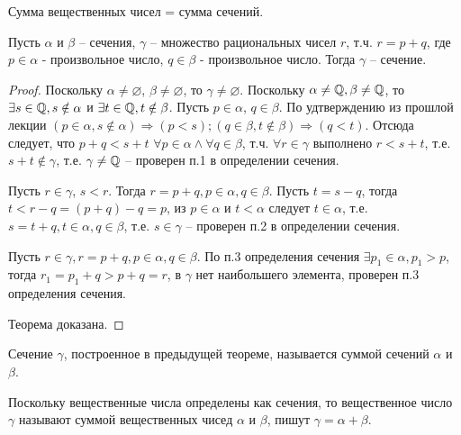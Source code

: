 \documentclass[main]{subfiles}
\begin{document}
\begin{definition}
    Сумма вещественных чисел = сумма сечений.
\end{definition}
\begin{theorem}
    Пусть $\alpha$ и $\beta$ -- сечения, $\gamma$ -- множество рациональных чисел
    $r$, т.ч. $r = p + q$, где $p \in \alpha$ - произвольное число, 
    $q \in \beta$ - произвольное число. Тогда $\gamma$ -- сечение.
\end{theorem}
\begin{proof}
    Поскольку $\alpha \neq \varnothing$, $\beta \neq \varnothing$, то 
    $\gamma \neq \varnothing$. Поскольку $\alpha \neq \mathbb{Q}, \beta \neq \mathbb{Q}$, то
    $\exists s \in \mathbb{Q}, s \notin \alpha$ и $\exists t \in \mathbb{Q}, t \notin \beta$.
    Пусть $p \in \alpha$, $q \in \beta$. 
    По удтверждению из прошлой лекции $(p \in \alpha, s \notin \alpha) \Rightarrow
    (p < s); (q \in \beta, t \notin \beta) \Rightarrow (q < t)$. 
    Отсюда следует, что $p + q < s + t$ $\forall p \in \alpha \wedge 
    \forall q \in \beta$, т.ч. $\forall r \in \gamma$ выполнено $r < s + t$, т.е.
    $s + t \notin \gamma$, т.е. $\gamma \neq \mathbb{Q}$ -- проверен п.1 в определении
    сечения.

    Пусть $r \in \gamma$, $s < r$. Тогда $r = p + q, p \in \alpha, q \in \beta$.
    Пусть $t = s - q$, тогда $t < r - q = (p + q) - q = p$, из $p \in \alpha$ и 
    $t < \alpha$ следует $t \in \alpha$, т.е. $s = t + q, t \in \alpha, 
    q \in \beta$, т.е. $s \in \gamma$ -- проверен п.2 в определении сечения.
    
    Пусть $r \in \gamma, r = p + q, p \in \alpha, q \in \beta$. По п.3 
    определения сечения $\exists p_1 \in \alpha, p_1 > p$, тогда 
    $r_1 = p_1 + q > p + q = r$, в $\gamma$ нет наибольшего элемента, проверен
    п.3 определения сечения.

    Теорема доказана.
\end{proof}

\begin{definition}
    Сечение $\gamma$, построенное в предыдущей теореме, называется суммой 
    сечений $\alpha$ и $\beta$.

    Поскольку вещественные числа определены как сечения, то вещественное число 
    $\gamma$ называют суммой вещественных чисед $\alpha$ и $\beta$, пишут
    $\gamma = \alpha + \beta$.
\end{definition}
\end{document}
